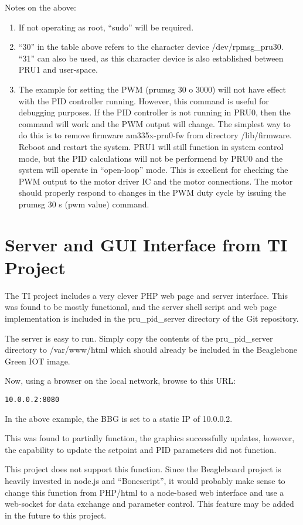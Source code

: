 Notes on the above:
\begin{enumerate}
\item If not operating as root, ``sudo'' will be required.
 
\item ``30'' in the table above refers to the character device /dev/rpmsg\_pru30.  ``31'' can also be used, as this character device is also established between PRU1 and user-space.
 
\item The example for setting the PWM (prumsg 30 o 3000) will not have effect with the PID controller running.  However, this command is useful for debugging purposes.  If the PID controller is not running in PRU0, then the command will work and the PWM output will change.  The simplest way to do this is to remove firmware am335x-pru0-fw from directory /lib/firmware.  Reboot and restart the system.  PRU1 will still function in system control mode, but the PID calculations will not be performend by PRU0 and the system will operate in ``open-loop'' mode.  This is excellent for checking the PWM output to the motor driver IC and the motor connections.  The motor should properly respond to changes in the PWM duty cycle by issuing the prumsg 30 s (pwm value) command.
\end{enumerate}

\section{Server and GUI Interface from TI Project}

The TI project includes a very clever PHP web page and server interface.  This was found to be mostly functional, and the server shell script and web page implementation is included in the pru\_pid\_server directory of the Git repository.

The server is easy to run.  Simply copy the contents of the pru\_pid\_server directory to /var/www/html which should already be included in the Beaglebone Green IOT image.

Now, using a browser on the local network, browse to this URL:

\begin{verbatim}
10.0.0.2:8080
\end{verbatim}

In the above example, the BBG is set to a static IP of 10.0.0.2.

This was found to partially function, the graphics successfully updates, however, the capability to update the setpoint and PID parameters did not function.

This project does not support this function.  Since the Beagleboard project is heavily invested in node.js and ``Bonescript'', it would probably make sense to change this function from PHP/html to a node-based web interface and use a web-socket for data exchange and parameter control.  This feature may be added in the future to this project.
